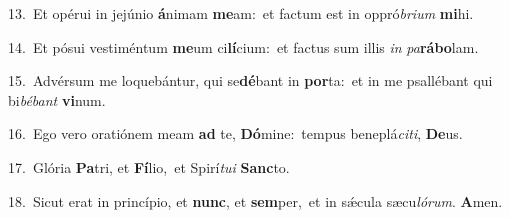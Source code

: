 {\numbfont\textcolor{\numbcolor}{13.}}~Et opérui in jejúnio \textbf{á}\-nimam \textbf{me}\-am:~\star et factum est in oppró\-\textit{bri}\-\textit{um} \textbf{mi}\-hi.\par
{\numbfont\textcolor{\numbcolor}{14.}}~Et pósui vestiméntum \textbf{me}\-um ci\-\textbf{lí}\-cium:~\star et factus sum illis \textit{in} \textit{pa}\-\textbf{rá}\textbf{bo}lam.\par
{\numbfont\textcolor{\numbcolor}{15.}}~Advérsum me loquebántur, qui se\-\textbf{dé}\-bant in \textbf{por}\-ta:~\star et in me psallébant qui bi\-\textit{bé}\-\textit{bant} \textbf{vi}\-num.\par
{\numbfont\textcolor{\numbcolor}{16.}}~Ego vero oratiónem meam \textbf{ad} te, \textbf{Dó}\-mine:~\star tempus beneplá\-\textit{ci}\-\textit{ti}, \textbf{De}\-us.\par
{\numbfont\textcolor{\numbcolor}{17.}}~Glória \textbf{Pa}\-tri, et \textbf{Fí}\-lio,~\star et Spirí\-\textit{tu}\-\textit{i} \textbf{Sanc}\-to.\par
{\numbfont\textcolor{\numbcolor}{18.}}~Sicut erat in princípio, et \textbf{nunc}\-, et \textbf{sem}\-per,~\star et in sǽcula sæcu\-\textit{ló}\-\textit{rum}. \textbf{A}\-men.\par
